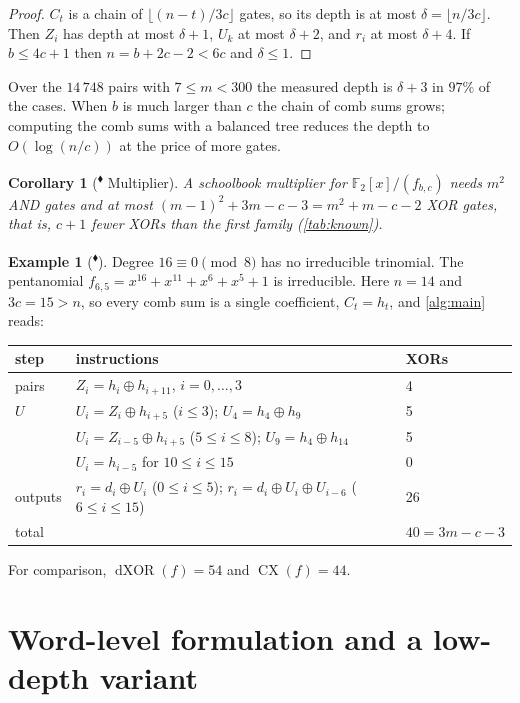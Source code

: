 \documentclass[11pt,a4paper]{article}
\theoremstyle{plain}
\newtheorem{corollary}[theorem]{Corollary}
\theoremstyle{definition}
\newtheorem{example}[theorem]{Example}
\newcommand{\F}{\mathbb{F}}
\newcommand{\dX}{\operatorname{dXOR}}
\newcommand{\CX}{\operatorname{CX}}
\newcommand{\xor}{\oplus}
\newcommand{\ours}{\textsuperscript{\textcolor{cblue}{$\blacklozenge$}}}
\begin{document}
\begin{proof}
$C_t$ is a chain of $\lfloor(n-t)/3c\rfloor$ gates, so its depth is at most
$\delta=\lfloor n/3c\rfloor$. Then $Z_i$ has depth at most $\delta+1$, $U_k$ at most
$\delta+2$, and $r_i$ at most $\delta+4$. If $b\le 4c+1$ then $n=b+2c-2<6c$ and
$\delta\le1$.
\end{proof}

Over the $14\,748$ pairs with $7\le m<300$ the measured depth is $\delta+3$ in $97\%$ of
the cases. When $b$ is much larger than $c$ the chain of comb sums grows; computing the comb
sums with a balanced tree reduces the depth to $O(\log(n/c))$ at the price of more gates.

\begin{corollary}[\ours{} Multiplier]\label{cor:mult}
A schoolbook multiplier for $\F_2[x]/(f_{b,c})$ needs $m^2$ AND gates and at most
$(m-1)^2+3m-c-3=m^2+m-c-2$ XOR gates, that is, $c+1$ fewer XORs than the first family
(\cref{tab:known}).
\end{corollary}

\begin{example}[\ours]\label{ex:16}
Degree $16\equiv0\pmod8$ has no irreducible trinomial. The pentanomial
$f_{6,5}=x^{16}+x^{11}+x^6+x^5+1$ is irreducible. Here $n=14$ and $3c=15>n$, so every
comb sum is a single coefficient, $C_t=h_t$, and \cref{alg:main} reads:
\begin{center}\small
\begin{tabular}{@{}l l l@{}}
\toprule
step & instructions & XORs\\
\midrule
pairs & $Z_i=h_i\xor h_{i+11}$, $i=0,\dots,3$ & 4\\
$U$ & $U_i=Z_i\xor h_{i+5}$ ($i\le3$); $U_4=h_4\xor h_9$ & 5\\
    & $U_i=Z_{i-5}\xor h_{i+5}$ ($5\le i\le8$); $U_9=h_4\xor h_{14}$ & 5\\
    & $U_i=h_{i-5}$ for $10\le i\le 15$ & 0\\
outputs & $r_i=d_i\xor U_i$ ($0\le i\le5$); $r_i=d_i\xor U_i\xor U_{i-6}$ ($6\le i\le15$) & 26\\
\midrule
total & & $40=3m-c-3$\\
\bottomrule
\end{tabular}
\end{center}
For comparison, $\dX(f)=54$ and $\CX(f)=44$.
\end{example}


\section{Word-level formulation and a low-depth variant}\label{sec:word}
\end{document}
